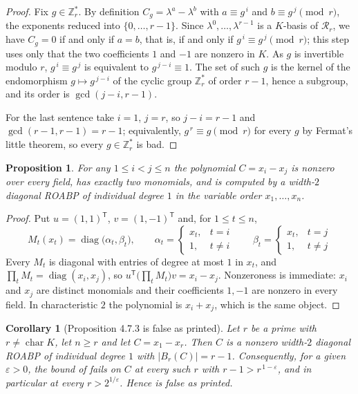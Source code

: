 \documentclass[11pt]{amsart}
\newtheorem{corollary}[theorem]{Corollary}
\newtheorem{proposition}[theorem]{Proposition}
\theoremstyle{definition}
\theoremstyle{remark}
\newcommand{\KK}{K}
\newcommand{\Rr}{\mathcal{R}_r}
\newcommand{\Zrs}{\mathbb{Z}_r^{*}}
\newcommand{\Bad}{B_r}
\begin{document}
\begin{proof}
Fix $g\in\Zrs$. By definition $C_g=\lambda^{a}-\lambda^{b}$ with
$a\equiv g^{\,i}$ and $b\equiv g^{\,j} \pmod r$, the exponents reduced into $\{0,\dots,r-1\}$.
Since $\lambda^0,\dots,\lambda^{r-1}$ is a $\KK$-basis of $\Rr$, we have $C_g=0$ if and only if
$a=b$, that is, if and only if $g^{\,i}\equiv g^{\,j}\pmod r$; this step uses only that the two
coefficients $1$ and $-1$ are nonzero in $\KK$.
As $g$ is invertible modulo $r$, $g^{\,i}\equiv g^{\,j}$ is equivalent to $g^{\,j-i}\equiv 1$.
The set of such $g$ is the kernel of the endomorphism $g\mapsto g^{\,j-i}$ of the cyclic group
$\Zrs$ of order $r-1$, hence a subgroup, and its order is $\gcd(j-i,r-1)$.

For the last sentence take $i=1$, $j=r$, so $j-i=r-1$ and $\gcd(r-1,r-1)=r-1$; equivalently,
$g^{\,r}\equiv g\pmod r$ for every $g$ by Fermat's little theorem, so every $g\in\Zrs$ is bad.
\end{proof}

\begin{proposition}\label{prop:class}
For any $1\le i<j\le n$ the polynomial $C=x_i-x_j$ is nonzero over every field, has exactly two
monomials, and is computed by a width-$2$ \emph{diagonal} ROABP of individual degree $1$ in the
variable order $x_1,\dots,x_n$.
\end{proposition}

\begin{proof}
Put $u=(1,1)^{\mathsf T}$, $v=(1,-1)^{\mathsf T}$ and, for $1\le t\le n$,
\[
 M_t(x_t)=\operatorname{diag}\bigl(\alpha_t,\beta_t\bigr),
 \qquad
 \alpha_t=\begin{cases}x_t,& t=i\\ 1,&t\ne i\end{cases}
 \qquad
 \beta_t=\begin{cases}x_t,& t=j\\ 1,&t\ne j\end{cases}
\]
Every $M_t$ is diagonal with entries of degree at most $1$ in $x_t$, and
$\prod_t M_t=\operatorname{diag}(x_i,x_j)$, so
$u^{\mathsf T}\bigl(\prod_t M_t\bigr)v=x_i-x_j$. Nonzeroness is immediate: $x_i$ and $x_j$ are
distinct monomials and their coefficients $1,-1$ are nonzero in every field. In characteristic
$2$ the polynomial is $x_i+x_j$, which is the same object.
\end{proof}

\begin{corollary}[Proposition 4.7.3 is false as printed]\label{cor:prop}
Let $r$ be a prime with $r\ne\operatorname{char}\KK$, let $n\ge r$ and let $C=x_1-x_r$.
Then $C$ is a nonzero width-$2$ diagonal ROABP of individual degree $1$ with $|\Bad(C)|=r-1$.
Consequently, for a given $\varepsilon>0$, the bound of \cite[Conjecture~4.7.2]{SS} fails on $C$ at
every such $r$ with $r-1>r^{\,1-\varepsilon}$, and in particular at every $r>2^{1/\varepsilon}$.
Hence \cite[Proposition~4.7.3, printed p.~28]{SS} is false as printed.
\end{corollary}
\end{document}
